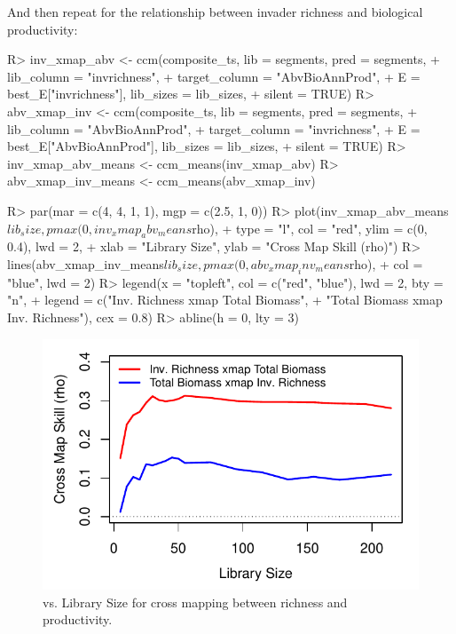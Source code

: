 \documentclass[article]{jss}
\begin{document}
And then repeat for the relationship between invader richness and biological productivity:
\begin{Schunk}
\begin{Sinput}
R> inv_xmap_abv <- ccm(composite_ts, lib = segments, pred = segments, 
+                      lib_column = "invrichness", 
+                      target_column = "AbvBioAnnProd", 
+                      E = best_E["invrichness"], lib_sizes = lib_sizes, 
+                      silent = TRUE)
R> abv_xmap_inv <- ccm(composite_ts, lib = segments, pred = segments, 
+                      lib_column = "AbvBioAnnProd", 
+                      target_column = "invrichness", 
+                      E = best_E["AbvBioAnnProd"], lib_sizes = lib_sizes, 
+                      silent = TRUE)
R> inv_xmap_abv_means <- ccm_means(inv_xmap_abv)
R> abv_xmap_inv_means <- ccm_means(abv_xmap_inv)
\end{Sinput}
\end{Schunk}

\begin{Schunk}
\begin{Sinput}
R> par(mar = c(4, 4, 1, 1), mgp = c(2.5, 1, 0))
R> plot(inv_xmap_abv_means$lib_size, pmax(0, inv_xmap_abv_means$rho), 
+       type = "l", col = "red", ylim = c(0, 0.4), lwd = 2, 
+       xlab = "Library Size", ylab = "Cross Map Skill (rho)")
R> lines(abv_xmap_inv_means$lib_size, pmax(0, abv_xmap_inv_means$rho),
+        col = "blue", lwd = 2)
R> legend(x = "topleft", col = c("red", "blue"), lwd = 2, bty = "n", 
+         legend = c("Inv. Richness xmap Total Biomass", 
+                    "Total Biomass xmap Inv. Richness"), cex = 0.8)
R> abline(h = 0, lty = 3)
\end{Sinput}
\end{Schunk}

\begin{figure}[t!]
\begin{center}
\includegraphics[width=4.5in]{article-ccm-e120-inv-abv}
\end{center}
\caption{\label{fig:ccm-e120-inv-abv}  vs. Library Size for cross mapping between richness and productivity.}
\end{figure}
\end{document}
